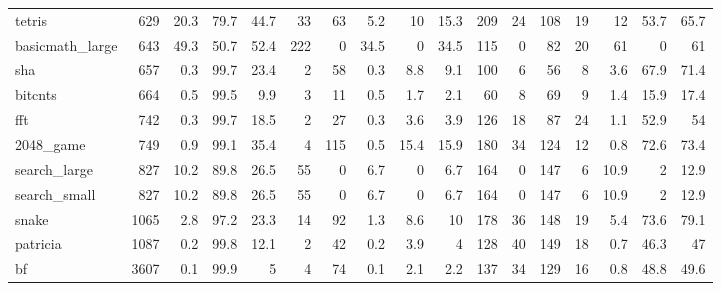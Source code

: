 \begin{tabular}{lrrrrrrrrrrrrrrrr}
 tetris          &            629 &   20.3 &        79.7 &   44.7 &    33 &      63 &    5.2 &     10   &          15.3 &  209 &        24 &      108 &   19 &   12   &     53.7 &          65.7 \\
 basicmath\_large &            643 &   49.3 &        50.7 &   52.4 &   222 &       0 &   34.5 &      0   &          34.5 &  115 &         0 &       82 &   20 &   61   &      0   &          61   \\
 sha             &            657 &    0.3 &        99.7 &   23.4 &     2 &      58 &    0.3 &      8.8 &           9.1 &  100 &         6 &       56 &    8 &    3.6 &     67.9 &          71.4 \\
 bitcnts         &            664 &    0.5 &        99.5 &    9.9 &     3 &      11 &    0.5 &      1.7 &           2.1 &   60 &         8 &       69 &    9 &    1.4 &     15.9 &          17.4 \\
 fft             &            742 &    0.3 &        99.7 &   18.5 &     2 &      27 &    0.3 &      3.6 &           3.9 &  126 &        18 &       87 &   24 &    1.1 &     52.9 &          54   \\
 2048\_game       &            749 &    0.9 &        99.1 &   35.4 &     4 &     115 &    0.5 &     15.4 &          15.9 &  180 &        34 &      124 &   12 &    0.8 &     72.6 &          73.4 \\
 search\_large    &            827 &   10.2 &        89.8 &   26.5 &    55 &       0 &    6.7 &      0   &           6.7 &  164 &         0 &      147 &    6 &   10.9 &      2   &          12.9 \\
 search\_small    &            827 &   10.2 &        89.8 &   26.5 &    55 &       0 &    6.7 &      0   &           6.7 &  164 &         0 &      147 &    6 &   10.9 &      2   &          12.9 \\
 snake           &           1065 &    2.8 &        97.2 &   23.3 &    14 &      92 &    1.3 &      8.6 &          10   &  178 &        36 &      148 &   19 &    5.4 &     73.6 &          79.1 \\
 patricia        &           1087 &    0.2 &        99.8 &   12.1 &     2 &      42 &    0.2 &      3.9 &           4   &  128 &        40 &      149 &   18 &    0.7 &     46.3 &          47   \\
 bf              &           3607 &    0.1 &        99.9 &    5   &     4 &      74 &    0.1 &      2.1 &           2.2 &  137 &        34 &      129 &   16 &    0.8 &     48.8 &          49.6 \\

\end{tabular}

